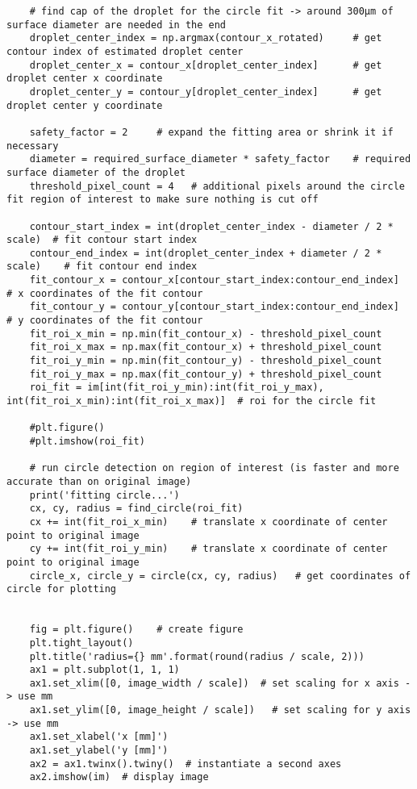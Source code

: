\begin{lstlisting}
    # find cap of the droplet for the circle fit -> around 300µm of surface diameter are needed in the end
    droplet_center_index = np.argmax(contour_x_rotated)     # get contour index of estimated droplet center
    droplet_center_x = contour_x[droplet_center_index]      # get droplet center x coordinate
    droplet_center_y = contour_y[droplet_center_index]      # get droplet center y coordinate

    safety_factor = 2     # expand the fitting area or shrink it if necessary
    diameter = required_surface_diameter * safety_factor    # required surface diameter of the droplet
    threshold_pixel_count = 4   # additional pixels around the circle fit region of interest to make sure nothing is cut off

    contour_start_index = int(droplet_center_index - diameter / 2 * scale)  # fit contour start index
    contour_end_index = int(droplet_center_index + diameter / 2 * scale)    # fit contour end index
    fit_contour_x = contour_x[contour_start_index:contour_end_index]    # x coordinates of the fit contour
    fit_contour_y = contour_y[contour_start_index:contour_end_index]    # y coordinates of the fit contour
    fit_roi_x_min = np.min(fit_contour_x) - threshold_pixel_count
    fit_roi_x_max = np.max(fit_contour_x) + threshold_pixel_count
    fit_roi_y_min = np.min(fit_contour_y) - threshold_pixel_count
    fit_roi_y_max = np.max(fit_contour_y) + threshold_pixel_count
    roi_fit = im[int(fit_roi_y_min):int(fit_roi_y_max), int(fit_roi_x_min):int(fit_roi_x_max)]  # roi for the circle fit

    #plt.figure()
    #plt.imshow(roi_fit)

    # run circle detection on region of interest (is faster and more accurate than on original image)
    print('fitting circle...')
    cx, cy, radius = find_circle(roi_fit)
    cx += int(fit_roi_x_min)    # translate x coordinate of center point to original image
    cy += int(fit_roi_y_min)    # translate x coordinate of center point to original image
    circle_x, circle_y = circle(cx, cy, radius)   # get coordinates of circle for plotting


    fig = plt.figure()    # create figure
    plt.tight_layout()
    plt.title('radius={} mm'.format(round(radius / scale, 2)))
    ax1 = plt.subplot(1, 1, 1)
    ax1.set_xlim([0, image_width / scale])  # set scaling for x axis -> use mm
    ax1.set_ylim([0, image_height / scale])   # set scaling for y axis -> use mm
    ax1.set_xlabel('x [mm]')
    ax1.set_ylabel('y [mm]')
    ax2 = ax1.twinx().twiny()  # instantiate a second axes
    ax2.imshow(im)  # display image


\end{lstlisting}
